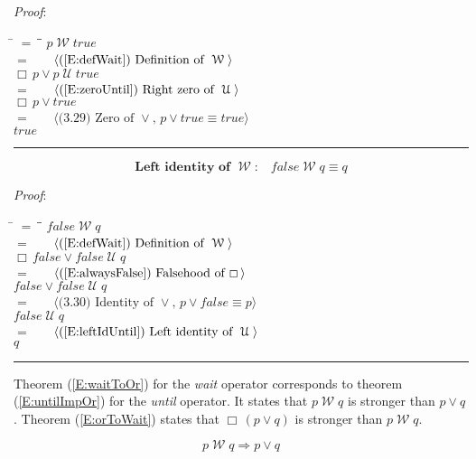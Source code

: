 \documentclass[12pt, fleqn, leqno]{article}
\newcommand{\lgap}{2pt}                             %
\newcommand{\mymathindent}{24pt}                    %
\newcommand{\impl}{\ensuremath{\Rightarrow}}        %
\newcommand{\Until}{\;\mathcal{U}\;}
\newcommand{\Wait}{\;\mathcal{W}\;}
\newcommand{\Always}{\Box\,}
\newcommand{\myqed}{\rule[-.23ex]{1.2ex}{2.0ex}}
\newcommand{\myqedtab}{\hspace{384pt}}              %
\newcommand{\Gll} {\langle}                         %
\newcommand{\Ggg} {\rangle}                         %
\newcommand{\Hint}[1]     {\ \ \ $\Gll              \mbox{#1} \Ggg$ }   %
\begin{document}
\emph{Proof}:
\begin{tabbing}
\hspace{\mymathindent} \= $= \;$ \= \myqedtab \= \kill
\> \> $p \Wait true$\\[\lgap]
\> $=$ \> \Hint{(\ref{E:defWait}) Definition of $\Wait$} \\[\lgap]
\> \> $\Always p \lor p\Until true$\\[\lgap]
\> $=$ \> \Hint{(\ref{E:zeroUntil}) Right zero of $\Until$} \\[\lgap]
\> \> $\Always p \lor true$\\[\lgap]
\> $=$ \> \Hint{(3.29) Zero of $\lor$, $p\lor true\equiv true$}\\[\lgap]
\> \> $true$ \quad \myqed
\end{tabbing}
\begin{equation}\label{E:leftIdentWait}
\textbf{Left identity of $\Wait$:}\quad false \Wait q \equiv q
\end{equation}

\emph{Proof}:
\begin{tabbing}
\hspace{\mymathindent} \= $= \;$ \= \myqedtab \= \kill
\> \> $false \Wait q$\\[\lgap]
\> $=$ \> \Hint{(\ref{E:defWait}) Definition of $\Wait$} \\[\lgap]
\> \> $\Always false \lor false\Until q$\\[\lgap]
\> $=$ \> \Hint{(\ref{E:alwaysFalse}) Falsehood of $\Always$} \\[\lgap]
\> \> $false \lor false\Until q$\\[\lgap]
\> $=$ \> \Hint{(3.30) Identity of $\lor$, $p\lor false\equiv p$} \\[\lgap]
\> \> $false\Until q$\\[\lgap]
\> $=$ \> \Hint{(\ref{E:leftIdUntil}) Left identity of $\Until$}\\[\lgap]
\> \> $q$ \quad \myqed
\end{tabbing}

Theorem (\ref{E:waitToOr}) for the \textit{wait} operator corresponds to theorem (\ref{E:untilImpOr}) for the \textit{until} operator.
It states that $p \Wait q$ is stronger than $p \lor q$.
Theorem (\ref{E:orToWait}) states that $\Always(p \lor q)$ is stronger than $p \Wait q$.

\begin{equation}\label{E:waitToOr}
p \Wait q \impl p \lor q
\end{equation}
\end{document}
